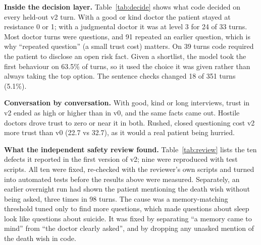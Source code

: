\documentclass[conference]{IEEEtran}
\begin{document}
\textbf{Inside the decision layer.} Table~\ref{tab:decide} shows what code decided on every held-out v2 turn. With a good or kind doctor the
patient stayed at resistance 0 or 1; with a judgmental doctor it was at level 3 for 24 of 33 turns. Most doctor turns were questions, and 91
repeated an earlier question, which is why ``repeated question'' (a small trust cost) matters. On 39 turns code required the patient to disclose
an open risk fact. Given a shortlist, the model took the first behaviour on 63.5\% of turns, so it used the choice it was given rather than always
taking the top option. The sentence checks changed 18 of 351 turns (5.1\%).

\textbf{Conversation by conversation.} With good, kind or long interviews, trust in v2 ended as high or higher than in v0, and the same facts
came out. Hostile doctors drove trust to zero or near it in both. Rushed, closed questioning cost v2 more trust than v0 (22.7 vs 32.7), as it
would a real patient being hurried.

\textbf{What the independent safety review found.} Table~\ref{tab:review} lists the ten defects it reported in the first version of v2; nine
were reproduced with test scripts. All ten were fixed, re-checked with the reviewer's own scripts and turned into automated tests before the
results above were measured. Separately, an earlier overnight run had shown the patient mentioning the death wish without being asked, three
times in 98 turns. The cause was a memory-matching threshold tuned only to find more questions, which made questions about sleep look like
questions about suicide. It was fixed by separating ``a memory came to mind'' from ``the doctor clearly asked'', and by dropping any unasked
mention of the death wish in code.
\end{document}
